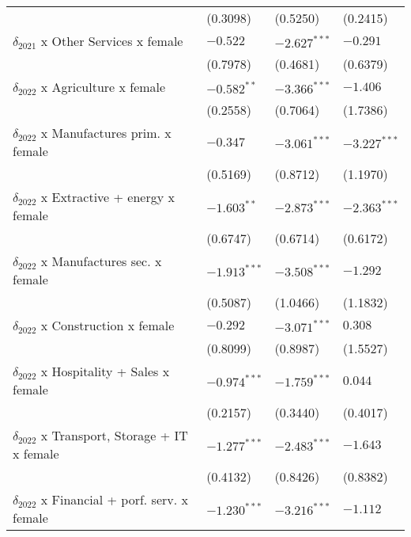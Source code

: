 \begin{tabular}{llll}
                                                   &        (0.3098) &        (0.5250) &        (0.2415) \\
$\delta_{2021}$ x Other Services x female          &        $-0.522$ &  $-2.627^{***}$ &        $-0.291$ \\
                                                   &        (0.7978) &        (0.4681) &        (0.6379) \\
$\delta_{2022}$ x Agriculture x female             &   $-0.582^{**}$ &  $-3.366^{***}$ &        $-1.406$ \\
                                                   &        (0.2558) &        (0.7064) &        (1.7386) \\
$\delta_{2022}$ x Manufactures prim. x female      &        $-0.347$ &  $-3.061^{***}$ &  $-3.227^{***}$ \\
                                                   &        (0.5169) &        (0.8712) &        (1.1970) \\
$\delta_{2022}$ x Extractive + energy x female     &   $-1.603^{**}$ &  $-2.873^{***}$ &  $-2.363^{***}$ \\
                                                   &        (0.6747) &        (0.6714) &        (0.6172) \\
$\delta_{2022}$ x Manufactures sec. x female       &  $-1.913^{***}$ &  $-3.508^{***}$ &        $-1.292$ \\
                                                   &        (0.5087) &        (1.0466) &        (1.1832) \\
$\delta_{2022}$ x Construction x female            &        $-0.292$ &  $-3.071^{***}$ &         $0.308$ \\
                                                   &        (0.8099) &        (0.8987) &        (1.5527) \\
$\delta_{2022}$ x Hospitality + Sales x female     &  $-0.974^{***}$ &  $-1.759^{***}$ &         $0.044$ \\
                                                   &        (0.2157) &        (0.3440) &        (0.4017) \\
$\delta_{2022}$ x Transport, Storage + IT x female &  $-1.277^{***}$ &  $-2.483^{***}$ &        $-1.643$ \\
                                                   &        (0.4132) &        (0.8426) &        (0.8382) \\
$\delta_{2022}$ x Financial + porf. serv. x female &  $-1.230^{***}$ &  $-3.216^{***}$ &        $-1.112$ \\

\end{tabular}
